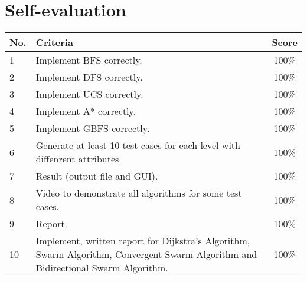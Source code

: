 \pagebreak
\section{Self-evaluation}
\begin{center}
  \renewcommand{\arraystretch}{1.5}
  \begin{tabular}{|l|p{}|c|}
    \hline
    \textbf{No.} & \textbf{Criteria}                                                                                                                  & \textbf{Score} \\ \hline
    1            & Implement BFS correctly.                                                                                                           & 100\%          \\ \hline
    2            & Implement DFS correctly.                                                                                                           & 100\%          \\ \hline
    3            & Implement UCS correctly.                                                                                                           & 100\%          \\ \hline
    4            & Implement A* correctly.                                                                                                            & 100\%          \\ \hline
    5            & Implement GBFS correctly.                                                                                                          & 100\%          \\ \hline
    6            & Generate at least 10 test cases for each level with diffenrent attributes.                                                         & 100\%          \\ \hline
    7            & Result (output file and GUI).                                                                                                      & 100\%          \\ \hline
    8            & Video to demonstrate all algorithms for some test cases.                                                                           & 100\%          \\ \hline
    9            & Report.                                                                                                                            & 100\%          \\ \hline
    10           & Implement, written report for Dijkstra's Algorithm, Swarm Algorithm, Convergent Swarm Algorithm and Bidirectional Swarm Algorithm. & 100\%          \\ \hline
  \end{tabular}
\end{center}